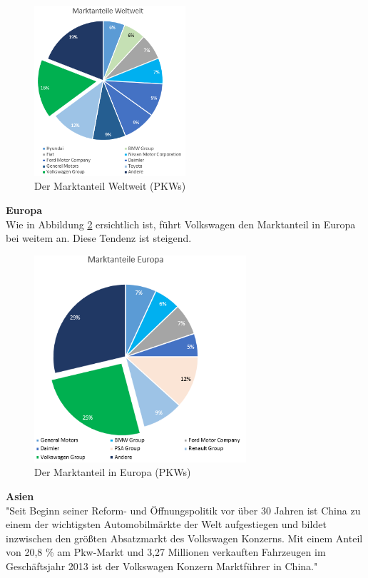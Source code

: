 \documentclass[12pt]{article}
\begin{document}
\begin{figure}[!h]
\centering
\includegraphics[width=0.5\textwidth]{images/maww}
\caption{Der Marktanteil Weltweit (PKWs)}
\label{fig:marktwelt}
\end{figure}\FloatBarrier
\noindent
\textbf{Europa}\\
Wie in Abbildung \ref{fig:markteuropa} ersichtlich ist, führt Volkswagen den Marktanteil in Europa bei weitem an. Diese Tendenz ist steigend.
\begin{figure}[!h]
\centering
\includegraphics[width=0.7\textwidth]{images/maie}
\caption{Der Marktanteil in Europa (PKWs)}
\label{fig:markteuropa}
\end{figure}\FloatBarrier
\noindent
\textbf{Asien}\\
"Seit Beginn seiner Reform- und Öffnungspolitik vor über 30 Jahren ist China zu einem der wichtigsten Automobilmärkte der Welt aufgestiegen und bildet inzwischen den größten Absatzmarkt des Volkswagen Konzerns. Mit einem Anteil von 20,8 \% am Pkw-Markt und 3,27 Millionen verkauften Fahrzeugen im Geschäftsjahr 2013 ist der Volkswagen Konzern Marktführer in China."\cite{vwwebsitechina}\\
\end{document}
